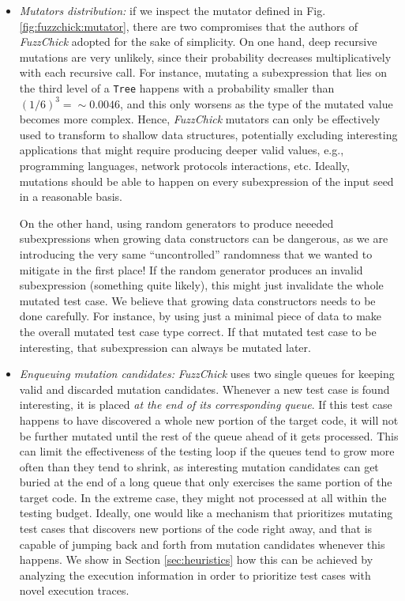 \documentclass[acmsmall, anonymous]{acmart}
\newcommand{\fuzzchick}{\textit{FuzzChick}\xspace}
\begin{document}
\begin{itemize}
\item \emph{Mutators distribution:} if we inspect the mutator defined in Fig.
  \ref{fig:fuzzchick:mutator}, there are two compromises that the authors of
  \fuzzchick adopted for the sake of simplicity.
  On one hand, deep recursive mutations are very unlikely, since their
  probability decreases multiplicatively with each recursive call.
  For instance, mutating a subexpression that lies on the third level of a
  \texttt{Tree} happens with a probability smaller than $(1/6)^3 = \sim 0.0046$,
  and this only worsens as the type of the mutated value becomes more complex.
  Hence, \fuzzchick mutators can only be effectively used to transform to
  shallow data structures, potentially excluding interesting applications that
  might require producing deeper valid values, e.g., programming languages,
  network protocols interactions, etc.
  Ideally, mutations should be able to happen on every subexpression of the
  input seed in a reasonable basis.

  On the other hand, using random generators to produce neeeded subexpressions
  when growing data constructors can be dangerous, as we are introducing the
  very same ``uncontrolled'' randomness that we wanted to mitigate in the first
  place!
  If the random generator produces an invalid subexpression (something quite
  likely), this might just invalidate the whole mutated test case.
  We believe that growing data constructors needs to be done carefully.
  For instance, by using just a minimal piece of data to make the overall
  mutated test case type correct.
  If that mutated test case to be interesting, that subexpression can always be
  mutated later.

\item \emph{Enqueuing mutation candidates:} \fuzzchick uses two single queues for
  keeping valid and discarded mutation candidates.
  Whenever a new test case is found interesting, it is placed \emph{at the end
    of its corresponding queue}.
  If this test case happens to have discovered a whole new portion of the target
  code, it will not be further mutated until the rest of the queue ahead of it
  gets processed.
  This can limit the effectiveness of the testing loop if the queues tend to
  grow more often than they tend to shrink, as interesting mutation candidates
  can get buried at the end of a long queue that only exercises the same portion
  of the target code.
  In the extreme case, they might not processed at all within the testing budget.
  Ideally, one would like a mechanism that prioritizes mutating test cases
  that discovers new portions of the code right away, and that is capable of
  jumping back and forth from mutation candidates whenever this happens.
  We show in Section \ref{sec:heuristics} how this can be achieved by analyzing
  the execution information in order to prioritize test cases with novel
  execution traces.



\end{itemize}
\end{document}
